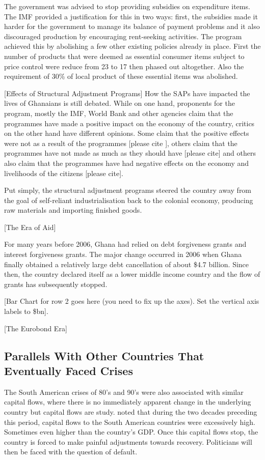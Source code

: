 \documentclass[a4paper, 12pt]{article}
\begin{document}
	The government was advised to stop providing subsidies on expenditure items. The IMF provided a justification for this in two ways: first, the subsidies made it harder for the government to manage its balance of payment problems and it also discouraged production by encouraging rent-seeking activities. The program achieved this by abolishing a few other existing policies already in place. First the number of products that were deemed as essential consumer items subject to price control were reduce from 23 to 17 then phased out altogether. Also the requirement of 30\% of local product of these essential items was abolished.
	
	
	[Effects of Structural Adjustment Programs]
	How the SAPs have impacted the lives of Ghanaians is still debated. While on one hand, proponents for the program, mostly the IMF, World Bank and other agencies claim that the programmes have made a positive impact on the economy of the country, critics on the other hand have different opinions. Some claim that the positive effects were not as a result of the programmes [please cite ], others claim that the programmes have not made as much as they should have [please cite] and others also claim that the programmes have had negative effects on the economy and livelihoods of the citizens [please cite].
	\cite{AssessingAdju}
	\cite{StructuralAdj_1}
	\cite{StructuralAdj}
	\cite{okoroafo1993imf}
	\cite{Backtothefu}
	
	Put simply, the structural adjustment programs steered the country away from the goal of self-reliant industrialisation back to the colonial economy, producing raw materials and importing finished goods.
	
	[The Era of Aid]
	\cite{tsikata1999aid}
	\cite{Foreignaidd}
	\cite{Tradeopenness}
	\cite{Riddell09}
	
	For many years before 2006, Ghana had relied on debt forgiveness grants and interest forgiveness grants. The major change occurred in 2006 when Ghana finally obtained a relatively large debt cancellation of about \$4.7 billion. Since then, the country declared itself as a lower middle income country and the flow of grants has subsequently stopped.
	
	[Bar Chart for row 2 goes here (you need to fix up the axes). Set the vertical axis labels to \$bn].
	
	
	[The Eurobond Era]
	
	\subsection{Parallels With Other Countries That Eventually Faced Crises}
	The South American crises of 80's and 90's were also associated with similar capital flows, where there is no immediately apparent change in the underlying country but capital flows are study.  noted that during the two decades preceding this period, capital flows to the South American countries were excessively high. Sometimes even higher than the country's GDP. Once this capital flows stop, the country is forced to make painful adjustments towards recovery. Politicians will then be faced with the question of default. 
\end{document}
